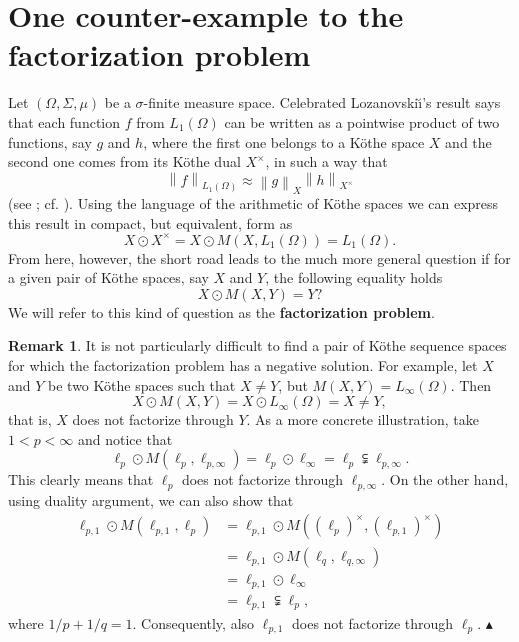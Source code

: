 \documentclass[11pt]{amsart}
\theoremstyle{definition}
\theoremstyle{definition}
\theoremstyle{definition}
\theoremstyle{definition}
\theoremstyle{definition}
\theoremstyle{definition}
\newtheorem{remark}[theorem]{Remark}
\theoremstyle{definition}
\theoremstyle{definition}
\numberwithin{equation}{section}
\numberwithin{equation}{section}
\numberwithin{equation}{section}
\theoremstyle{definition}
\theoremstyle{definition}
\theoremstyle{definition}
\theoremstyle{definition}
\theoremstyle{definition}
\theoremstyle{definition}
\newcommand{\norm}[1]{\left\lVert#1\right\rVert}
\newcommand\xqed[1]{%
	\leavevmode\unskip\penalty9999 \hbox{}\nobreak\hfill
	\quad\hbox{#1}}
\newcommand\demo{\xqed{{\Large $\blacktriangle$}}}
\begin{document}
\appendix

\section{{\bf One counter-example to the factorization problem}} \label{Appendix B}

Let $(\Omega,\Sigma,\mu)$ be a $\sigma$-finite measure space.
Celebrated Lozanovski{\u \i}'s result says that each function $f$ from $L_1(\Omega)$ can be written as a pointwise product of two functions,
say $g$ and $h$, where the first one belongs to a K{\" o}the space $X$ and the second one comes from its K{\" o}the dual $X^{\times}$,
in such a way that
\begin{equation*}
	\norm{f}_{L_1(\Omega)} \approx \norm{g}_X \norm{h}_{X^{\times}}
\end{equation*}
(see \cite[Theorem~6]{Loz69}; cf. \cite[p.~185]{Ma89}). Using the language of the arithmetic of K{\" o}the spaces we can
express this result in compact, but equivalent, form as
\begin{equation*}
	X \odot X^{\times} = X \odot M(X, L_1(\Omega)) = L_1(\Omega).
\end{equation*}
From here, however, the short road leads to the much more general question if for a given pair of K{\" o}the spaces, say $X$ and $Y$,
the following equality holds
\begin{equation*}
	X \odot M(X,Y) = Y?
\end{equation*}
We will refer to this kind of question as the {\bf factorization problem}.

\begin{remark}
	It is not particularly difficult to find a pair of K{\" o}the sequence spaces for which the factorization problem has a negative solution.
	For example, let $X$ and $Y$ be two K{\" o}the spaces such that $X \neq Y$, but $M(X,Y) = L_{\infty}(\Omega)$. Then
	\begin{equation*}
		X \odot M(X,Y) = X \odot L_{\infty}(\Omega) = X \neq Y,
	\end{equation*}
	that is, $X$ does not factorize through $Y$. As a more concrete illustration, take $1 < p < \infty$ and notice that
	\begin{equation*}
		\ell_p \odot M(\ell_p, \ell_{p,\infty}) = \ell_p \odot \ell_{\infty} = \ell_p \subsetneqq \ell_{p,\infty}.
	\end{equation*}
	This clearly means that $\ell_p$ does not factorize through $\ell_{p,\infty}$. On the other hand, using duality argument, we can also show that
	\begin{align*}
		\ell_{p,1} \odot M(\ell_{p,1}, \ell_{p})
			& = \ell_{p,1} \odot M((\ell_{p})^{\times}, (\ell_{p,1})^{\times}) \\
			& = \ell_{p,1} \odot M(\ell_q, \ell_{q,\infty}) \\
			& = \ell_{p,1} \odot \ell_{\infty} \\
			& = \ell_{p,1} \subsetneqq \ell_{p},
	\end{align*}
	where $1/p + 1/q = 1$. Consequently, also $\ell_{p,1}$ does not factorize through $\ell_p$.
	\demo
\end{remark}
\end{document}
